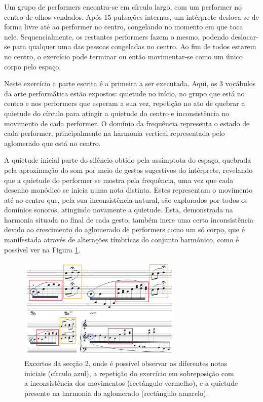 \documentclass[../main.tex]{subfiles}
\begin{document}
\begin{performex}
    Um grupo de performers encontra-se em círculo largo, com um performer no centro de olhos vendados. Após 15 pulsações internas, um intérprete desloca-se de forma livre até ao performer no centro, congelando no momento em que toca nele. Sequencialmente, os restantes performers fazem o mesmo, podendo deslocar-se para qualquer uma das pessoas congeladas no centro. Ao fim de todos estarem no centro, o exercício pode terminar ou então movimentar-se como um único corpo pelo espaço.
\end{performex}

Neste exercício a parte escrita é a primeira a ser executada. Aqui, os 3 vocábulos da arte performática estão expostos: quietude no início, no grupo que está no centro e nos performers que esperam a sua vez, repetição no ato de quebrar a quietude do círculo para atingir a quietude do centro e inconsistência no movimento de cada performer. O domínio da frequência representa o estado de cada performer, principalmente na harmonia vertical representada pelo aglomerado que está no centro. 

A quietude inicial parte do silêncio obtido pela assímptota do espaço, quebrada pela aproximação do som por meio de gestos sugestivos do intérprete, revelando que a quietude do performer se mostra pela frequência, uma vez que cada desenho monódico se inicia numa nota distinta. Estes representam o movimento até ao centro que, pela sua inconsistência natural, são explorados por todos os domínios sonoros, atingindo novamente a quietude. Esta, demonstrada na harmonia situada no final de cada gesto, também inere uma certa inconsistência devido ao crescimento do aglomerado de performers como um só corpo, que é manifestada através de alterações tímbricas do conjunto harmónico, como é possível ver na Figura \ref{fig:obra2}.

\begin{figure}[h]
    \centering
    \captionsetup{width=0.8\textwidth}
    \includegraphics[width=0.7\textwidth]{images/obra2.png}
    \caption{Excertos da secção 2, onde é possível observar as diferentes notas iniciais (círculo azul), a repetição do exercício em sobreposição com a inconsistência dos movimentos (rectângulo vermelho), e a quietude presente na harmonia do aglomerado (rectângulo amarelo).}
    \label{fig:obra2}
\end{figure}
\end{document}
